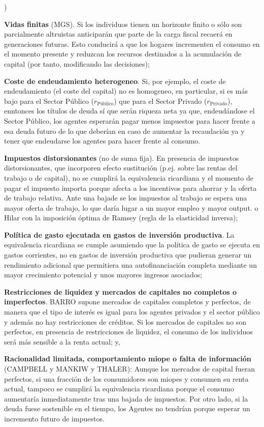 \documentclass[10pt,a4paper]{article}
\newcounter{alphaitem}
\newenvironment{la}
      {\begin{list}{\alph{alphaitem})}{%
          \usecounter{alphaitem}%
          \setlength{\leftmargin}{1cm}%
          \setlength{\parskip}{3pt}%
          \setlength{\itemsep}{0pt}%
          \setlength{\parsep}{0pt}%
      }}
      {\end{list}}
\begin{document}
\begin{la}
    \item \textbf{Vidas finitas} (MGS). Si los individuos tienen un horizonte finito o sólo son parcialmente altruistas anticiparán que parte de la carga fiscal recaerá en generaciones futuras. Esto conducirá a que los hogares incrementen el consumo en el momento presente y reduzcan los recursos destinados a la acumulación de capital (por tanto, modificando las decisiones);
    \item \textbf{Coste de endeudamiento heterogeneo}. Si, por ejemplo, el coste de endeudamiento (el coste del capital) no es homogeneo, en particular, si es más bajo para el Sector Público ($r_{\text{Público}}$) que para el Sector Privado ($r_{\text{Privado}}$), enntonces los títulos de deuda sí que serán riqueza neta ya que, endeudándose el Sector Público, los agentes esperarán pagar menos impuestos para hacer frente a esa deuda futuro de lo que deberían en caso de aumentar la recaudación ya y tener que endeudarse los agentes para hacer frente al consumo.
    \item \textbf{Impuestos distorsionantes} (no de suma fija). En presencia de impuestos distorsionantes, que incorporen efecto sustitución (p.ej. sobre las rentas del trabajo o de capital), no se cumplirá la equivalencia ricardiana y el momento de pagar el impuesto importa porque afecta a los incentivos para ahorrar y la oferta de trabajo relativa. Ante una bajade se los impuestos al trabajo se espera una mayor oferta de trabajo, lo que daría lugar a un mayor empleo y mayor output. o Hilar con la imposición óptima de Ramsey (regla de la elasticidad inversa);
    \item \textbf{Política de gasto ejecutada en gastos de inversión productiva}. La equivalencia ricardiana se cumple asumiendo que la política de gasto se ejecuta en gastos corrientes, no en gastos de inversión productiva que pudieran generar un rendimiento adicional que permitiera una autofinanciación completa mediante un mayor crecimiento potencial y unos mayores ingresos asociados;
    \item \textbf{Restricciones de liquidez y mercados de capitales no completos o imperfectos}. BARRO supone mercados de capitales completos y perfectos, de manera que el tipo de interés es igual para los agentes privados y el sector público y además no hay restricciones de créditos. Si los mercados de capitales no son perfectos, en presencia de restricciones de liquidez, el consumo de los individuos será más sensible a la renta actual; y,
    \item \textbf{Racionalidad limitada, comportamiento miope o falta de información} (CAMPBELL y MANKIW y THALER): Aunque los mercados de capital fueran perfectos, si una fracción de los consumidores son miopes y consumen su renta actual, tampoco se cumplirá la equivalencia ricardiana porque el consumo aumentaría inmediatamente tras una bajada de impuestos. Por otro lado, si la deuda fuese sostenible en el tiempo, los Agentes no tendrían porque esperar un incremento futuro de impuestos.
\end{la}
\end{document}
